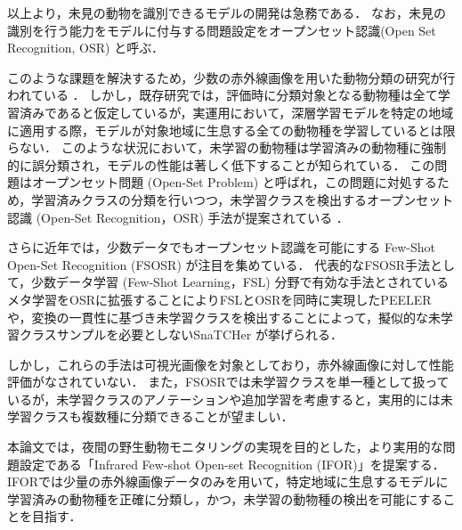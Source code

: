 \documentclass[a4paper,11pt,nomag]{jsreport}
\begin{document}
以上より，未見の動物を識別できるモデルの開発は急務である．
なお，未見の識別を行う能力をモデルに付与する問題設定をオープンセット認識(Open Set Recognition, OSR) と呼ぶ．


このような課題を解決するため，少数の赤外線画像を用いた動物分類の研究が行われている \cite{kishimoto2023}．
しかし，既存研究では，評価時に分類対象となる動物種は全て学習済みであると仮定しているが，実運用において，深層学習モデルを特定の地域に適用する際，モデルが対象地域に生息する全ての動物種を学習しているとは限らない．
このような状況において，未学習の動物種は学習済みの動物種に強制的に誤分類され，モデルの性能は著しく低下することが知られている．
この問題はオープンセット問題 (Open-Set Problem) と呼ばれ，この問題に対処するため，学習済みクラスの分類を行いつつ，未学習クラスを検出するオープンセット認識 (Open-Set Recognition，OSR) 手法が提案されている \cite{sun2020, sagar2022}．

さらに近年では，少数データでもオープンセット認識を可能にする Few-Shot Open-Set Recognition (FSOSR) \cite{peeler} が注目を集めている．
代表的なFSOSR手法として，少数データ学習 (Few-Shot Learning，FSL) 分野で有効な手法とされているメタ学習をOSRに拡張することによりFSLとOSRを同時に実現したPEELER \cite{peeler}や，変換の一貫性に基づき未学習クラスを検出することによって，擬似的な未学習クラスサンプルを必要としないSnaTCHer \cite{snatcher}が挙げられる．

しかし，これらの手法は可視光画像を対象としており，赤外線画像に対して性能評価がなされていない．
また，FSOSRでは未学習クラスを単一種として扱っているが，未学習クラスのアノテーションや追加学習を考慮すると，実用的には未学習クラスも複数種に分類できることが望ましい．

本論文では，夜間の野生動物モニタリングの実現を目的とした，より実用的な問題設定である「Infrared Few-shot Open-set Recognition (IFOR)」を提案する．
IFORでは少量の赤外線画像データのみを用いて，特定地域に生息するモデルに学習済みの動物種を正確に分類し，かつ，未学習の動物種の検出を可能にすることを目指す．
\end{document}
